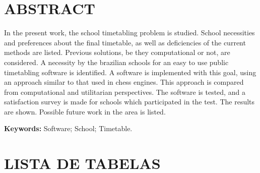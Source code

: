 \documentclass[12pt,a4paper]{article}
\begin{document}
	\thispagestyle{empty}
	\section*{ABSTRACT}

	In the present work, the school timetabling problem is studied. School necessities and preferences about the final timetable, as well as deficiencies of the current methods are listed. Previous solutions, be they computational or not, are considered. A necessity by the brazilian schools for an easy to use public timetabling software is identified. A software is implemented with this goal, using an approach similar to that used in chess engines. This approach is compared from computational and utilitarian perspectives. The software is tested, and a satisfaction survey is made for schools which participated in the test. The results are shown. Possible future work in the area is listed.

	\begingroup
		\setlength{\parindent}{0mm}
		\textbf{Keywords:} Software; School; Timetable.
	\endgroup

	\newpage



	\thispagestyle{empty}
	\section*{LISTA DE TABELAS}
\end{document}
